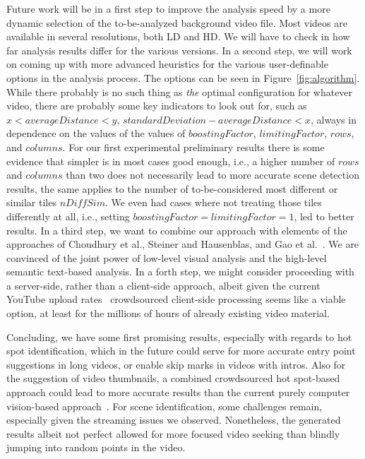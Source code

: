 \documentclass[10pt,twocolumn,letterpaper]{article}
\begin{document}
Future work will be in a first step to improve the analysis speed by a more dynamic selection of the to-be-analyzed background video file. Most videos are available in several resolutions, both LD and HD. We will have to check in how far analysis results differ for the various versions. In a second step, we will work on coming up with more advanced heuristics for the various user-definable options in the analysis process. The options can be seen in Figure~\ref{fig:algorithm}. While there probably is no such thing as \emph{the} optimal configuration for whatever video, there are probably some key indicators to look out for, such as $x < averageDistance  < y$, $standardDeviation - averageDistance < x$, always in dependence on the values of the values of $boostingFactor$, $limitingFactor$, $rows$, and $columns$. For our first experimental preliminary results there is some evidence that simpler is in most cases good enough, i.e., a higher number of $rows$ and $columns$ than two does not necessarily lead to more accurate scene detection results, the same applies to the number of to-be-considered most different or similar tiles $nDiffSim$. We even had cases where not treating those tiles differently at all, i.e., setting $boostingFactor  = limitingFactor = 1$, led to better results. In a third step, we want to combine our approach with elements of the approaches of Choudhury et al., Steiner and Hausenblas, and Gao et al.~\cite{Choudhury:YouTube,Gao:2009,semwebvid}. We are convinced of the joint power of low-level visual analysis and the high-level semantic text-based analysis. In a forth step, we might consider proceeding with a server-side, rather than a client-side approach, albeit given the current YouTube upload rates~\cite{youtube:stats} crowdsourced client-side processing seems like a viable option, at least for the millions of hours of already existing video material.

Concluding, we have some first promising results, especially with regards to hot spot identification, which in the future could serve for more accurate entry point suggestions in long videos, or enable skip marks in videos with intros. Also for the suggestion of video thumbnails, a combined crowdsourced hot spot-based approach could lead to more accurate results than the current purely computer vision-based approach~\cite{googleresearch}. For scene identification, some challenges remain, especially given the streaming issues we observed. Nonetheless, the generated results albeit not perfect allowed for more focused video seeking than blindly jumping into random points in the video.

{\small


}
\end{document}
